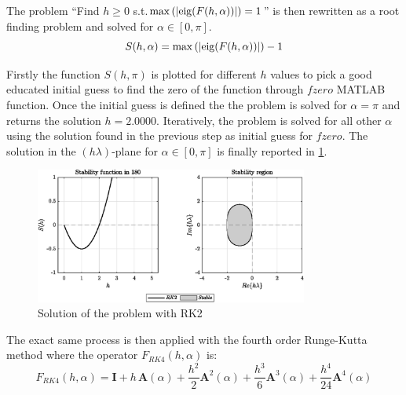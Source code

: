 \documentclass[11pt,a4paper,oneside]{article}
\renewcommand{\vec}[1]{\mathbf{#1}}
\begin{document}
The problem ``Find $h\ge 0$ s.t.$\max\left(|{\rm eig}(F(h,\alpha))|\right) = 1$'' is then rewritten as a root finding problem and solved for $\alpha\in[0, \pi]$.
\begin{equation} 
    S(h,\alpha)=\max\left(|{\rm eig}(F(h,\alpha))|\right) - 1
    \label{eq:ex3_problemRK2}
\end{equation}

Firstly the function $S(h,\pi)$ is plotted for different $h$ values to pick a good educated initial guess to find the zero of the function through $fzero$ MATLAB function.
Once the initial guess is defined the the problem is solved for $\alpha = \pi$ and returns the solution $h=2.0000$.
Iteratively, the problem is solved for all other $\alpha$ using the solution found in the previous step as initial guess for $fzero$.
The solution in the $(h\lambda)$-plane for $\alpha\in[0, \pi]$ is finally reported in \cref{fig:ex3_stabilityRK2}.
\begin{figure}[htb]
    \centering
    \includegraphics*[width=0.8\textwidth, keepaspectratio]{ex3_rk2.eps}
    \caption[]{\label{fig:ex3_stabilityRK2} Solution of the problem with RK2}
\end{figure}

\clearpage
The exact same process is then applied with the fourth order Runge-Kutta method where the operator $F_{RK4}(h,\alpha)$ is:
\begin{equation} 
    F_{RK4}(h,\alpha) = \vec{I} + h\, \vec{A}(\alpha) + \frac{h^2}{2} \vec{A}^2(\alpha) + \frac{h^3}{6} \vec{A}^3(\alpha) + \frac{h^4}{24} \vec{A}^4(\alpha)
    \label{eq:ex3_operatorRK4}
\end{equation}
\end{document}
